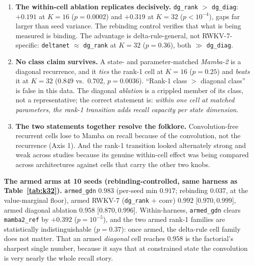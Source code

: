 \documentclass{article}
\newcommand{\armed}{\texttt{armed\_gdn}}
\newcommand{\dnet}{\texttt{deltanet}}
\newcommand{\dgrank}{\texttt{dg\_rank}}
\newcommand{\dgdiag}{\texttt{dg\_diag}}
\newcommand{\mambaref}{\texttt{mamba2\_ref}}
\begin{document}
\begin{enumerate}[leftmargin=1.4em,itemsep=2pt]
\item \textbf{The within-cell ablation replicates decisively.} \dgrank{} $>$ \dgdiag{}: $+0.191$ at $K{=}16$ ($p{=}0.0002$) and $+0.319$ at $K{=}32$ ($p{<}10^{-4}$), gaps far larger than seed variance. The rebinding control verifies that what is being measured is binding. The advantage is delta-rule-general, not RWKV-7-specific: \dnet{} $\approx$ \dgrank{} at $K{=}32$ ($p{=}0.36$), both $\gg$ \dgdiag{}.
\item \textbf{No class claim survives.} A state- and parameter-matched \emph{Mamba-2} is a diagonal recurrence, and it \emph{ties} the rank-1 cell at $K{=}16$ ($p{=}0.25$) and \emph{beats} it at $K{=}32$ ($0.849$ vs.\ $0.702$, $p{=}0.0036$). ``Rank-1 class $>$ diagonal class'' is false in this data. The diagonal \emph{ablation} is a crippled member of its class, not a representative; the correct statement is: \emph{within one cell at matched parameters, the rank-1 transition adds recall capacity per state dimension}.
\item \textbf{The two statements together resolve the folklore.} Convolution-free recurrent cells lose to Mamba on recall because of the convolution, not the recurrence (Axis 1). And the rank-1 transition looked alternately strong and weak across studies because its genuine within-cell effect was being compared across architectures against cells that carry the other two knobs.
\end{enumerate}

\textbf{The armed arms at 10 seeds (rebinding-controlled, same harness as Table~\ref{tab:k32}).} \armed{} $0.983$ (per-seed min $0.917$; rebinding $0.037$, at the value-marginal floor), armed RWKV-7 (\dgrank{} $+$ conv) $0.992$ [$0.970, 0.999$], armed diagonal ablation $0.958$ [$0.870, 0.996$]. Within-harness, \armed{} clears \mambaref{} by $+0.392$ ($p{=}10^{-5}$), and the two armed rank-1 families are statistically indistinguishable ($p{=}0.37$): once armed, the delta-rule cell family does not matter. That an armed \emph{diagonal} cell reaches $0.958$ is the factorial's sharpest single number, because it says that at constrained state the convolution is very nearly the whole recall story.
\end{document}
